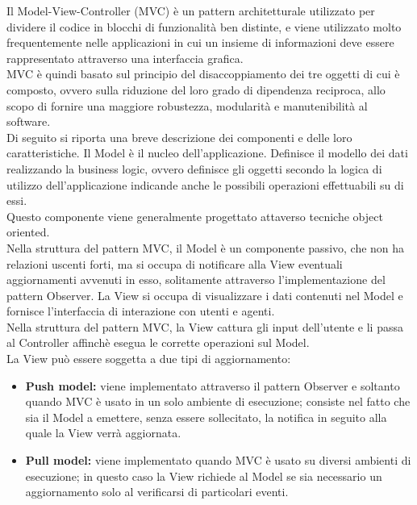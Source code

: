  \label{app:MVC}
 Il Model-View-Controller (MVC) è un pattern architetturale utilizzato per dividere il codice in blocchi di funzionalità ben distinte, e viene utilizzato molto frequentemente nelle applicazioni in cui un insieme di informazioni deve essere rappresentato attraverso una interfaccia grafica.\\
 MVC è quindi basato sul principio del disaccoppiamento dei tre oggetti di cui è composto, ovvero sulla riduzione del loro grado di dipendenza reciproca, allo scopo di fornire una maggiore robustezza, modularità e manutenibilità al software.\\
 Di seguito si riporta una breve descrizione dei componenti e delle loro caratteristiche. 
 Il Model è il nucleo dell'applicazione. Definisce il modello dei dati realizzando la business logic, ovvero definisce gli oggetti secondo la logica di utilizzo dell'applicazione indicande anche le possibili operazioni effettuabili su di essi.\\
 Questo componente viene generalmente progettato attaverso tecniche object oriented.\\
 Nella struttura del pattern MVC, il Model è un componente passivo, che non ha relazioni uscenti forti, ma si occupa di notificare alla View eventuali aggiornamenti avvenuti in esso, solitamente attraverso l'implementazione del pattern Observer.
 La View si occupa di visualizzare i dati contenuti nel Model e fornisce l'interfaccia di interazione con utenti e agenti.\\
 Nella struttura del pattern MVC, la View cattura gli input dell'utente e li passa al Controller affinchè esegua le corrette operazioni sul Model. \\
 La View può essere soggetta a due tipi di aggiornamento:
 \begin{itemize}
 \item \textbf{Push model:} viene implementato attraverso il pattern Observer e soltanto quando MVC è usato in un solo ambiente di esecuzione; consiste nel fatto che sia il Model a emettere, senza essere sollecitato, la notifica in seguito alla quale la View verrà aggiornata.
 \item \textbf{Pull model:} viene implementato quando MVC è usato su diversi ambienti di esecuzione; in questo caso la View richiede al Model se sia necessario un aggiornamento solo al verificarsi di particolari eventi.
 \end{itemize}
